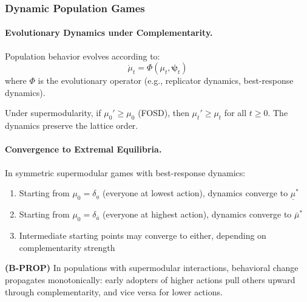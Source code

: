 \subsubsection{Dynamic Population Games}

\paragraph{Evolutionary Dynamics under Complementarity.}

Population behavior evolves according to:
\begin{equation}
\dot{\mu}_t = \Phi(\mu_t, \boldsymbol{\psi}_t)
\end{equation}
where $\Phi$ is the evolutionary operator (e.g., replicator dynamics, best-response 
dynamics).

\begin{theorem}
\label{thm:monotone-dynamics}
Under supermodularity, if $\mu_0' \geq \mu_0$ (FOSD), then $\mu_t' \geq \mu_t$ for all 
$t \geq 0$. The dynamics preserve the lattice order.
\end{theorem}

\paragraph{Convergence to Extremal Equilibria.}

\begin{proposition}
\label{prop:basin}
In symmetric supermodular games with best-response dynamics:
\begin{enumerate}
    \item Starting from $\mu_0 = \delta_{\underline{a}}$ (everyone at lowest action), 
    dynamics converge to $\underline{\mu}^*$
    \item Starting from $\mu_0 = \delta_{\bar{a}}$ (everyone at highest action), 
    dynamics converge to $\bar{\mu}^*$
    \item Intermediate starting points may converge to either, depending on 
    complementarity strength
\end{enumerate}
\end{proposition}

\begin{axiom}
\label{ax:B-PROP}
\textbf{(B-PROP)} In populations with supermodular interactions, behavioral change 
propagates monotonically: early adopters of higher actions pull others upward through 
complementarity, and vice versa for lower actions.
\end{axiom}

